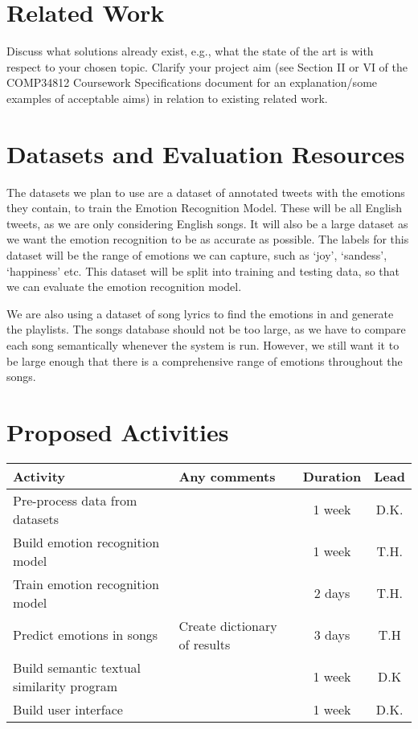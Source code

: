 \documentclass[11pt]{article}
\begin{document}
\section{Related Work}
Discuss what solutions already exist, e.g., what the state of the art is with respect to your chosen topic. Clarify your project aim (see Section II or VI of the COMP34812 Coursework Specifications document for an explanation/some examples of acceptable aims) in relation to existing related work.

\section{Datasets and Evaluation Resources}
The datasets we plan to use are a dataset of annotated tweets\cite{gupta_2021}\cite{pandey_2022} with the emotions they contain, to train the Emotion Recognition Model. These will be all English tweets, as we are only considering English songs. It will also be a large dataset as we want the emotion recognition to be as accurate as possible. The labels for this dataset will be the range of emotions we can capture, such as `joy', `sandess', `happiness' etc. This dataset will be split into training and testing data, so that we can evaluate the emotion recognition model.

We are also using a dataset of song lyrics\cite{shah_2021} to find the emotions in and generate the playlists. The songs database should not be too large, as we have to compare each song semantically whenever the system is run. However, we still want it to be large enough that there is a comprehensive range of emotions throughout the songs.

\section{Proposed Activities}

\begin{table}[h]
\centering
\begin{tabular}{|l|l|c|c|}
\hline
\textbf{Activity} & \textbf{Any comments} & \textbf{Duration} & \textbf{Lead}\\
\hline
Pre-process data from datasets & & 1 week & D.K. \\
\hline
Build emotion recognition model & & 1 week & T.H. \\
\hline
Train emotion recognition model & & 2 days & T.H. \\
\hline
Predict emotions in songs & Create dictionary of results & 3 days & T.H \\
\hline
Build semantic textual similarity program & & 1 week & D.K \\
\hline
Build user interface & & 1 week & D.K. \\
\hline

\end{tabular}
\end{table}




\end{document}
